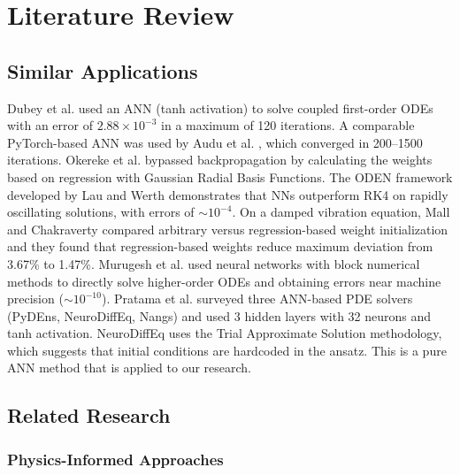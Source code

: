 \section{Literature Review}

\subsection{Similar Applications}

Dubey et al. \cite{dubey2024solving} used an ANN (tanh activation) to solve coupled first-order ODEs with an error of $2.88 \times 10^{-3}$ in a maximum of 120 iterations. A comparable PyTorch-based ANN was used by Audu et al. \cite{audu2024utilizing}, which converged in 200--1500 iterations. Okereke et al. \cite{okereke2021novel} bypassed backpropagation by calculating the weights based on regression with Gaussian Radial Basis Functions. The ODEN framework developed by Lau and Werth \cite{lau2020oden} demonstrates that NNs outperform RK4 on rapidly oscillating solutions, with errors of $\sim 10^{-4}$. On a damped vibration equation, Mall and Chakraverty \cite{mall2013comparison} compared arbitrary versus regression-based weight initialization and they found that regression-based weights reduce maximum deviation from 3.67\% to 1.47\%. Murugesh et al. \cite{murugesh2025novel} used neural networks with block numerical methods to directly solve higher-order ODEs and obtaining errors near machine precision ($\sim 10^{-10}$). Pratama et al. \cite{pratama2022ann} surveyed three ANN-based PDE solvers (PyDEns, NeuroDiffEq, Nangs) and used 3 hidden layers with 32 neurons and tanh activation. NeuroDiffEq uses the Trial Approximate Solution methodology, which suggests that initial conditions are hardcoded in the ansatz. This is a pure ANN method that is applied to our research.


\subsection{Related Research}

\subsubsection{Physics-Informed Approaches}

